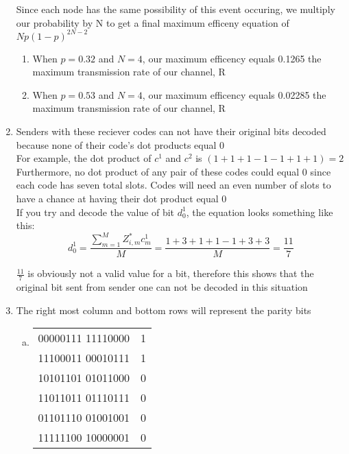 \documentclass[14pt]{article}
\begin{document}
\begin{enumerate}
Since each node has the same possibility of this event occuring, we multiply our probability by N to get a final maximum efficeny equation of $Np(1-p)^{2N - 2}$ \\
\begin{enumerate}
\item
When $p = 0.32$ and $N=4$, our maximum efficency equals 0.1265 the maximum transmission rate of our channel, R 
\item
When $p = 0.53$ and $N=4$, our maximum efficency equals 0.02285 the maximum transmission rate of our channel, R 
\end{enumerate}
\item
Senders with these reciever codes can not have their original bits decoded because none of their code's dot products equal 0 \\

For example, the dot product of $c^1$ and $c^2$ is $(1+1+1-1-1+1+1) = 2$ \\

Furthermore, no dot product of any pair of these codes could equal 0 since each code has seven total slots. Codes will need an even number of slots to have a chance at having their dot product equal 0 \\

If you try and decode the value of bit $d^1_0$, the equation looks something like this: \\

\[d^1_0 = \frac{\sum\limits_{m=1}^{M} Z^*_{i,m} c^1_m}{M} = \frac{1+3+1+1-1+3+3}{M} = \frac{11}{7}\] 

$\frac{11}{7}$ is obviously not a valid value for a bit, therefore this shows that the original bit sent from sender one can not be decoded in this situation

\item
The right most column and bottom rows will represent the parity bits
\begin{enumerate}[(a)]
\item
\begin{center}
\begin{tabular}{ c | c }
00000111 11110000 & 1\\
11100011 00010111 & 1\\
10101101 01011000 & 0\\
11011011 01110111 & 0\\
01101110 01001001 & 0\\
\hline
11111100 10000001 & 0\\
\end{tabular}
\end{center}


\end{enumerate}
\end{enumerate}
\end{document}
